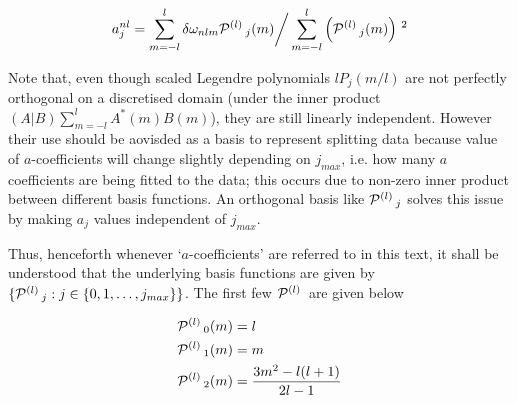 \begin{equation}
a^{nl}_j = \sum_{m=-l}^l \delta\omega_{nlm}\mathcal{P}^{(l)}\,_j(m) \bigg/ \sum_{m=-l}^l \left( \mathcal{P}^{(l)}\,_j(m) \right)\,^2
\end{equation}


Note that, even though scaled Legendre polynomials $lP_j(m/l)$ are not perfectly orthogonal on a discretised domain (under the inner product $(A|B)\sum_{m=-l}^l A^*(m)B(m)$), they are still linearly independent. However their use should be aovisded as a basis to represent splitting data because value of $a$-coefficients will change slightly depending on $j_{max}$, i.e. how many $a$ coefficients are being fitted to the data; this occurs due to non-zero inner product between different basis functions. An orthogonal basis like $\mathcal{P}^{(l)}\,_j$ solves this issue by making $a_j$ values independent of $j_{max}$.

Thus, henceforth whenever `$a$-coefficients' are referred to in this text, it shall be understood that the underlying basis functions are given by $\{\mathcal{P}^{(l)}\,_j: j\in \{0,1,\dots,j_{max}\}\}$. The first few $\mathcal{P}^{(l)}\,$ are given below

\begin{align}
\mathcal{P}^{(l)}\,_{0}(m) &= l \\
\mathcal{P}^{(l)}\,_1(m) &= m \\
\mathcal{P}^{(l)}\,_2(m) &= \frac{3m^2-l(l+1)}{2l-1}
\end{align}